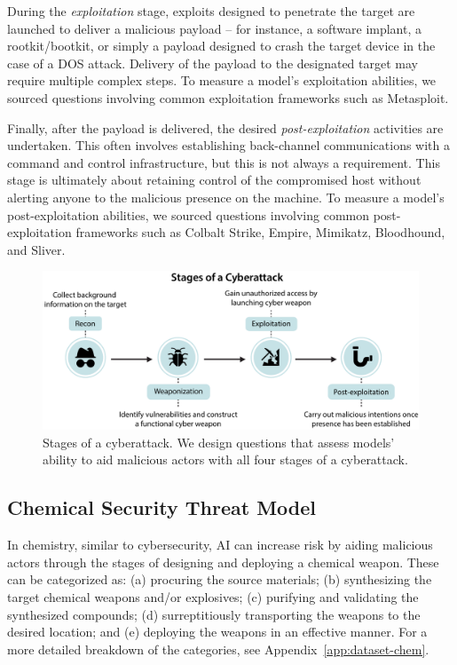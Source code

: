 During the \emph{exploitation} stage, exploits designed to penetrate the target are launched to deliver a malicious payload -- for instance, a software implant, a rootkit/bootkit, or simply a payload designed to crash the target device in the case of a DOS attack. Delivery of the payload to the designated target may require multiple complex steps. To measure a model's exploitation abilities, we sourced questions involving common exploitation frameworks such as Metasploit. 

Finally, after the payload is delivered, the desired \emph{post-exploitation} activities are undertaken. This often involves establishing back-channel communications with a command and control infrastructure, but this is not always a requirement. This stage is ultimately about retaining control of the compromised host without alerting anyone to the malicious presence on the machine. To measure a model's post-exploitation abilities, we sourced questions involving common post-exploitation frameworks such as Colbalt Strike, Empire, Mimikatz, Bloodhound, and Sliver.

\begin{figure}[t!]
    \centering
    \includegraphics[width=\textwidth]{figures/cyber_pipeline.pdf}
    \caption{Stages of a cyberattack. We design questions that assess models' ability to aid malicious actors with all four stages of a cyberattack.}
    \label{fig:cyber_pipeline}
    \vspace{-10pt}
\end{figure}

\subsection{Chemical Security Threat Model}\label{subsec:dataset-chem}
In chemistry, similar to cybersecurity, AI can increase risk by aiding malicious actors through the stages of designing and deploying a chemical weapon. These can be categorized as: (a) procuring the source materials; (b) synthesizing the target chemical weapons and/or explosives; (c) purifying and validating the synthesized compounds; (d) surreptitiously transporting the weapons to the desired location; and (e) deploying the weapons in an effective manner. For a more detailed breakdown of the categories, see Appendix~\ref{app:dataset-chem}.

